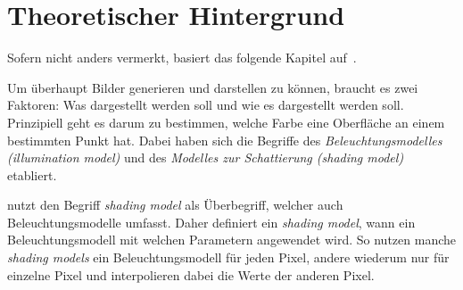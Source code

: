 
\chapter{Theoretischer Hintergrund}
\label{chap:theoretical_background}

Sofern nicht anders vermerkt, basiert das folgende Kapitel
auf~\cite[S. 721ff]{foley_computer_1996}.

Um überhaupt Bilder generieren und darstellen zu können, braucht es zwei
Faktoren: Was dargestellt werden soll und wie es dargestellt werden soll.
Prinzipiell geht es darum zu bestimmen, welche Farbe eine Oberfläche an einem
bestimmten Punkt hat. Dabei haben sich die Begriffe des
\textit{Beleuchtungsmodelles (illumination model)} und des \textit{Modelles zur Schattierung
(shading model)} etabliert.

\citeauthor{foley_computer_1996} nutzt den Begriff \textit{shading model} als
Überbegriff, welcher auch Beleuchtungsmodelle umfasst. Daher definiert ein
\textit{shading model}, wann ein Beleuchtungsmodell mit welchen
Parametern angewendet wird. So nutzen manche \textit{shading models} ein
Beleuchtungsmodell für jeden Pixel, andere wiederum nur für einzelne Pixel und
interpolieren dabei die Werte der anderen Pixel.



